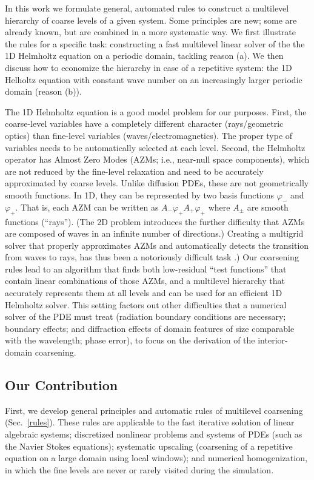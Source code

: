 \documentclass{article}
\begin{document}
In this work we formulate general, automated rules to construct a multilevel hierarchy of coarse levels of a given system. Some principles are new; some are already known, but are combined in a more systematic way. We first illustrate the rules for a specific task: constructing a fast multilevel linear solver of the the 1D Helmholtz equation on a periodic domain, tackling reason (a). We then discuss how to economize the hierarchy in case of a repetitive system: the 1D Helholtz equation with constant wave number on an increasingly larger periodic domain (reason (b)).

The 1D Helmholtz equation is a good model problem for our purposes. First, the coarse-level variables have a completely different character (rays/geometric optics) than fine-level variables (waves/electromagnetics). The proper type of variables needs to be automatically selected at each level. Second, the Helmholtz operator has Almost Zero Modes (AZMs; i.e., near-null space components), which are not reduced by the fine-level relaxation and need to be accurately approximated by coarse levels. Unlike diffusion PDEs, these are not geometrically smooth functions. In 1D, they can be represented by two basis functions $\varphi_-$ and $\varphi_+$. That is, each AZM can be written as $A_- \varphi_+ A_+ \varphi_+$ where $A_{\pm}$ are smooth functions (``rays''). (The 2D problem introduces the further difficulty that AZMs are composed of waves in an infinite number of directions.)  Creating a multigrid solver that properly approximates AZMs and automatically detects the transition from waves to rays, has thus been a notoriously difficult task \cite{wave_ray, later_papers}.) Our coarsening rules lead to an algorithm that finds both low-residual ``test functions'' that contain linear combinations of those AZMs, and a multilevel hierarchy that accurately represents them at all levels and can be used for an efficient 1D Helmholtz solver. This setting factors out other difficulties that a numerical solver of the PDE must treat (radiation boundary conditions are necessary; boundary effects; and diffraction effects of domain features of size comparable with the wavelength; phase error), to focus on the derivation of the interior-domain coarsening.

\subsection{Our Contribution}
First, we develop general principles and automatic rules of multilevel coarsening (Sec.~\ref{rules}). These rules are applicable to the fast iterative solution of linear algebraic systems; discretized nonlinear problems and systems of PDEs (such as the Navier Stokes equations); systematic upscaling (coarsening of a repetitive equation on a large domain using local windows); and numerical homogenization, in which the fine levels are never or rarely visited during the simulation.
\end{document}

